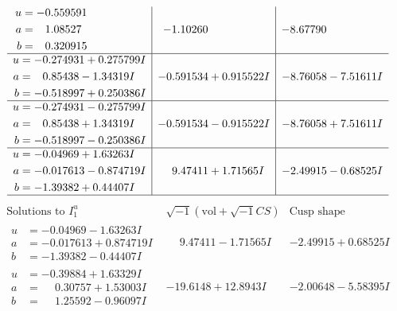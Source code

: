 \documentclass[1p]{elsarticle_modified}
\theoremstyle{definition}
\newcommand{\I}{\sqrt{-1}}
\begin{document}
$$\begin{array}{c|c|c}
\begin{aligned}
u &= -0.559591\phantom{ +0.000000I} \\
a &= \phantom{-}1.08527\phantom{ +0.000000I} \\
b &= \phantom{-}0.320915\phantom{ +0.000000I}\end{aligned}
 & -1.10260\phantom{ +0.000000I} & -8.67790\phantom{ +0.000000I} \\ \hline\begin{aligned}
u &= -0.274931 + 0.275799 I \\
a &= \phantom{-}0.85438 - 1.34319 I \\
b &= -0.518997 + 0.250386 I\end{aligned}
 & -0.591534 + 0.915522 I & -8.76058 - 7.51611 I \\ \hline\begin{aligned}
u &= -0.274931 - 0.275799 I \\
a &= \phantom{-}0.85438 + 1.34319 I \\
b &= -0.518997 - 0.250386 I\end{aligned}
 & -0.591534 - 0.915522 I & -8.76058 + 7.51611 I \\ \hline\begin{aligned}
u &= -0.04969 + 1.63263 I \\
a &= -0.017613 - 0.874719 I \\
b &= -1.39382 + 0.44407 I\end{aligned}
 & \phantom{-}9.47411 + 1.71565 I & -2.49915 - 0.68525 I\\
 \hline 
 \end{array}$$\newpage$$\begin{array}{c|c|c}  
\text{Solutions to }I^u_{1}& \I (\text{vol} + \sqrt{-1}CS) & \text{Cusp shape}\\
 \hline 
\begin{aligned}
u &= -0.04969 - 1.63263 I \\
a &= -0.017613 + 0.874719 I \\
b &= -1.39382 - 0.44407 I\end{aligned}
 & \phantom{-}9.47411 - 1.71565 I & -2.49915 + 0.68525 I \\ \hline\begin{aligned}
u &= -0.39884 + 1.63329 I \\
a &= \phantom{-}0.30757 + 1.53003 I \\
b &= \phantom{-}1.25592 - 0.96097 I\end{aligned}
 & -19.6148 + 12.8943 I & -2.00648 - 5.58395 I \\ \hline\begin{aligned}

\end{aligned}
\end{array}$$
\end{document}
